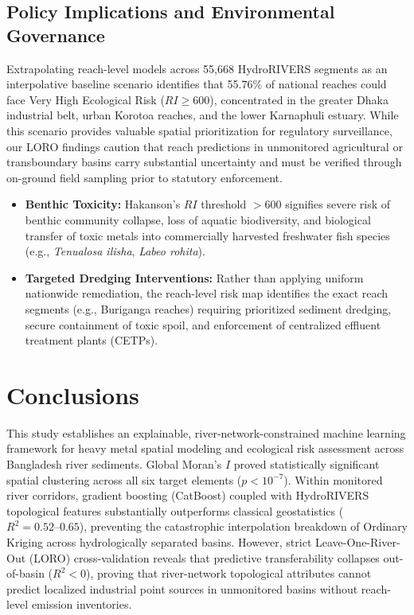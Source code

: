 \documentclass[authoryear,preprint,12pt]{elsarticle}
\begin{document}
\subsection{Policy Implications and Environmental Governance}
Extrapolating reach-level models across 55,668 HydroRIVERS segments as an interpolative baseline scenario identifies that 55.76\% of national reaches could face Very High Ecological Risk ($RI \ge 600$), concentrated in the greater Dhaka industrial belt, urban Korotoa reaches, and the lower Karnaphuli estuary. While this scenario provides valuable spatial prioritization for regulatory surveillance, our LORO findings caution that reach predictions in unmonitored agricultural or transboundary basins carry substantial uncertainty and must be verified through on-ground field sampling prior to statutory enforcement.
\begin{itemize}
    \item \textbf{Benthic Toxicity:} Hakanson's $RI$ threshold $>600$ signifies severe risk of benthic community collapse, loss of aquatic biodiversity, and biological transfer of toxic metals into commercially harvested freshwater fish species (e.g., \textit{Tenualosa ilisha}, \textit{Labeo rohita}).
    \item \textbf{Targeted Dredging Interventions:} Rather than applying uniform nationwide remediation, the reach-level risk map identifies the exact reach segments (e.g., Buriganga reaches) requiring prioritized sediment dredging, secure containment of toxic spoil, and enforcement of centralized effluent treatment plants (CETPs).
\end{itemize}

\section{Conclusions}
This study establishes an explainable, river-network-constrained machine learning framework for heavy metal spatial modeling and ecological risk assessment across Bangladesh river sediments. Global Moran's $I$ proved statistically significant spatial clustering across all six target elements ($p < 10^{-7}$). Within monitored river corridors, gradient boosting (CatBoost) coupled with HydroRIVERS topological features substantially outperforms classical geostatistics ($R^2 = 0.52\text{--}0.65$), preventing the catastrophic interpolation breakdown of Ordinary Kriging across hydrologically separated basins. However, strict Leave-One-River-Out (LORO) cross-validation reveals that predictive transferability collapses out-of-basin ($R^2 < 0$), proving that river-network topological attributes cannot predict localized industrial point sources in unmonitored basins without reach-level emission inventories. 
\end{document}
